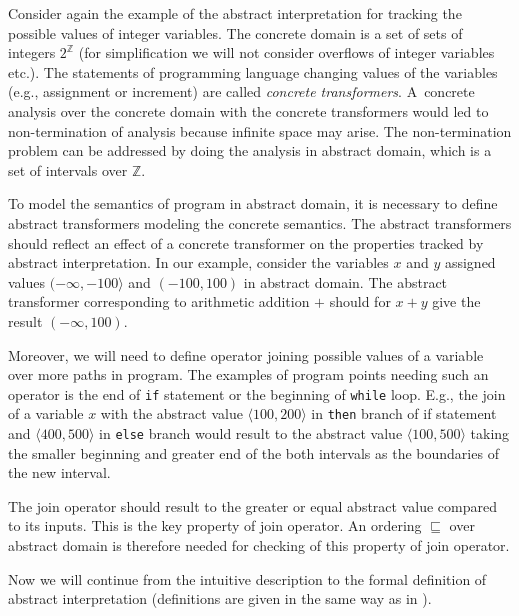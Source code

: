 \documentclass[a4paper, 12pt]{article}
\newcommand{\interval}[2]{\langle #1,#2 \rangle}
\newcommand{\aord}[0]{\sqsubseteq}
\begin{document}
Consider again the example of the abstract interpretation for tracking
the possible values of integer variables.
The concrete domain is a set of sets of integers $2^\mathbb{Z}$ (for simplification
we will not consider overflows of integer variables etc.).
The statements of programming language changing values of the variables
(e.g., assignment or increment) are called \emph{concrete transformers}.
A~concrete analysis over the concrete domain with the concrete transformers
would led to non-termination of analysis because infinite space may arise.
The non-termination problem can be addressed by doing the analysis in abstract domain,
which is a set of intervals over $\mathbb{Z}$.

To model the semantics of program in abstract domain, it is necessary to define
abstract transformers modeling the concrete semantics.
The abstract transformers should reflect an effect of a concrete transformer
on the properties tracked by abstract interpretation.
In our example, consider the variables $x$ and $y$ assigned values $(-\infty,-100\rangle$
and $(-100, 100)$ in abstract domain.
The abstract transformer corresponding to arithmetic addition $+$
should for $x+y$ give the result $(-\infty,100)$.

Moreover, we will need to define operator joining possible values
of a variable over more paths in program.
The examples of program points needing such an operator is
the end of \texttt{if} statement or the beginning of \texttt{while} loop.
E.g., the join of a variable $x$
with the abstract value $\interval{100}{200}$ in \texttt{then} branch
of if statement and $\interval{400}{500}$ in \texttt{else} branch
would result to the abstract value $\interval{100}{500}$ taking the smaller beginning
and greater end of the both intervals as the boundaries of the new interval.

The join operator should result to the greater or
equal abstract value compared to its inputs.
This is the key property of join operator.
An ordering $\aord$ over abstract domain is therefore needed
for checking of this property of join operator.

Now we will continue from the intuitive description to
the formal definition of abstract interpretation (definitions
are given in the same way as in \cite{popl77}).
\end{document}
